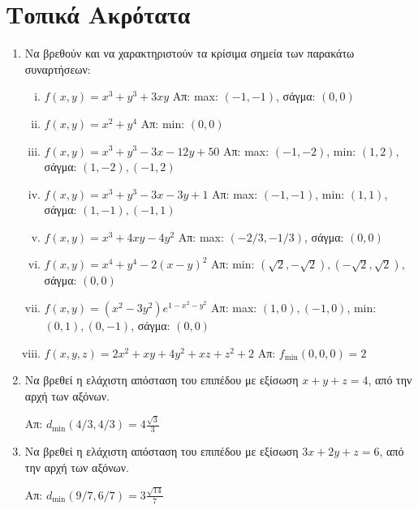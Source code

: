 \documentclass[a4paper,table]{report}
\begin{document}
\begin{center}
  \minibox{\large \bfseries \textcolor{Col1}{Ασκήσεις στα Ακρότατα}}
\end{center}


\section*{Τοπικά Ακρότατα}

\begin{enumerate}
  \item Να βρεθούν και να χαρακτηριστούν τα κρίσιμα σημεία  των παρακάτω συναρτήσεων:
    \begin{enumerate}[i)]
      \item $ f(x,y) = x^{3} + y^{3} + 3xy $ 
        \hfill Απ: max: $(-1,-1)  $, σάγμα: $ (0,0) $
      \item $ f(x,y) = x^{2}+y^{4} $ 
        \hfill Απ: min: $ (0,0) $ 
      \item $ f(x,y) = x^{3} + y^{3} - 3x -12y + 50 $ 
        \hfill Απ: max: $ (-1,-2)$, min: $ (1,2) $, 
        σάγμα: $ (1,-2), (-1,2) $
      \item $ f(x,y) = x^{3} + y^{3} -3x -3y + 1 $ 
        \hfill Απ: max: $(-1,-1)  $, min: $ (1,1) $,
        σάγμα: $ (1,-1), (-1,1) $
      \item $ f(x,y) = x^{3} + 4xy -4y^{2} $ 
        \hfill Απ: max: $ (-2/3, -1/3)  $, σάγμα: $ (0,0) $
      \item $ f(x,y) = x^{4} + y^{4} -2(x-y)^{2}$  
        \hfill Απ: min: $ (\sqrt{2} , -\sqrt{2}), (-\sqrt{2} , \sqrt{2}) $, 
        σάγμα: $ (0,0) $
      \item $ f(x,y) = (x^{2}-3y^{2})e^{1-x^{2}-y^{2}} $ 
        \hfill Απ: max: $ (1,0), (-1,0) $, min: $ (0,1), (0,-1) $, 
        σάγμα: $ (0,0) $
      \item $ f(x,y,z) = 2x^{2} + xy + 4y^{2} + xz + z^{2} + 2  $ \hfill Απ: 
        $ f_{\text{min}}(0,0,0) = 2 $
    \end{enumerate}

  \item Να βρεθεί η ελάχιστη απόσταση του επιπέδου με εξίσωση $ x+y+z=4 $, από την 
    αρχή των αξόνων.

    \hfill Απ: $ d_{\min}(4/3,4/3) = 4\frac{\sqrt{3}}{3} $  

  \item Να βρεθεί η ελάχιστη απόσταση του επιπέδου με εξίσωση $ 3x+2y+z=6 $, από την 
    αρχή των αξόνων.

    \hfill Απ: $ d_{\min}(9/7,6/7) = 3\frac{\sqrt{14}}{7} $  


\end{enumerate}
\end{document}
